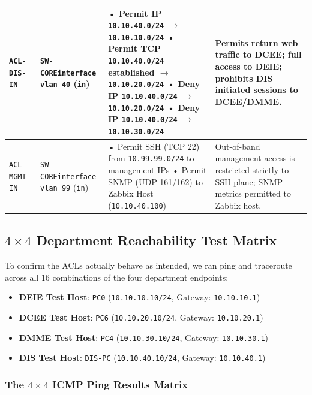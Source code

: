 \documentclass[11pt,a4paper]{article}
\begin{document}
\begin{table}[htbp]
\begin{tabularx}{\textwidth}{@{}l p{3.5cm} L L@{}}
\midrule
\texttt{ACL-DIS-IN} & \texttt{SW-CORE}\newline \texttt{interface vlan 40} (\texttt{in}) &
• Permit IP \texttt{10.10.40.0/24} $\rightarrow$ \texttt{10.10.10.0/24}\newline
• Permit TCP \texttt{10.10.40.0/24} established $\rightarrow$ \texttt{10.10.20.0/24}\newline
• Deny IP \texttt{10.10.40.0/24} $\rightarrow$ \texttt{10.10.20.0/24}\newline
• Deny IP \texttt{10.10.40.0/24} $\rightarrow$ \texttt{10.10.30.0/24} &
Permits return web traffic to DCEE; full access to DEIE; prohibits DIS initiated sessions to DCEE/DMME. \\
\midrule
\texttt{ACL-MGMT-IN} & \texttt{SW-CORE}\newline \texttt{interface vlan 99} (\texttt{in}) &
• Permit SSH (TCP 22) from \texttt{10.99.99.0/24} to management IPs\newline
• Permit SNMP (UDP 161/162) to Zabbix Host (\texttt{10.10.40.100}) &
Out-of-band management access is restricted strictly to SSH plane; SNMP metrics permitted to Zabbix host. \\
\bottomrule
\end{tabularx}
\end{table}

\subsection{\texorpdfstring{$4 \times 4$}{4x4} Department Reachability Test Matrix}

To confirm the ACLs actually behave as intended, we ran ping and traceroute across all 16 combinations of the four department endpoints:
\begin{itemize}
    \item \textbf{DEIE Test Host}: \texttt{PC0} (\texttt{10.10.10.10/24}, Gateway: \texttt{10.10.10.1})
    \item \textbf{DCEE Test Host}: \texttt{PC6} (\texttt{10.10.20.10/24}, Gateway: \texttt{10.10.20.1})
    \item \textbf{DMME Test Host}: \texttt{PC4} (\texttt{10.10.30.10/24}, Gateway: \texttt{10.10.30.1})
    \item \textbf{DIS Test Host}: \texttt{DIS-PC} (\texttt{10.10.40.10/24}, Gateway: \texttt{10.10.40.1})
\end{itemize}

\subsubsection{The \texorpdfstring{$4 \times 4$}{4x4} ICMP Ping Results Matrix}
\end{document}
